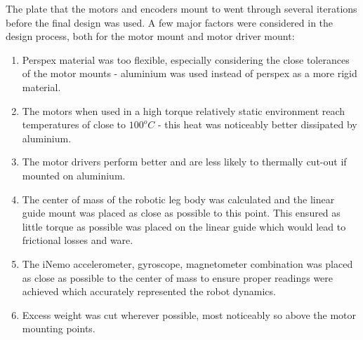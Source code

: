 The plate that the motors and encoders mount to went through several iterations before the final design was used. A few major factors were considered in the design process, both for the motor mount and motor driver mount:
\begin{enumerate}
\item Perspex material was too flexible, especially considering the close tolerances of the motor mounts - aluminium was used instead of perspex as a more rigid material.
\item The motors when used in a high torque relatively static environment reach temperatures of close to $100^oC$ - this heat was noticeably better dissipated by aluminium.
\item The motor drivers perform better and are less likely to thermally cut-out if mounted on aluminium.
\item The center of mass of the robotic leg body was calculated and the linear guide mount was placed as close as possible to this point. This ensured as little torque as possible was placed on the linear guide which would lead to frictional losses and ware.
\item The iNemo accelerometer, gyroscope, magnetometer combination was placed as close as possible to the center of mass to ensure proper readings were achieved which accurately represented the robot dynamics.
\item Excess weight was cut wherever possible, most noticeably so above the motor mounting points.
\end{enumerate}



